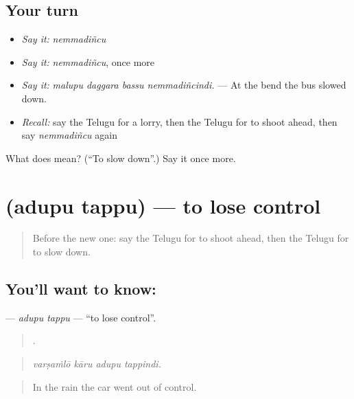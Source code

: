 \subsection*{Your turn}
\begin{itemize}
\raggedright
  \item \emph{Say it:} \emph{nemmadiñcu}
  \item \emph{Say it:} \emph{nemmadiñcu}, once more
  \item \emph{Say it:} \emph{malupu daggara bassu nemmadiñcindi.} — At the bend the bus slowed down.
  \item \emph{Recall:} say the Telugu for a lorry, then the Telugu for to shoot ahead, then say \emph{nemmadiñcu} again
\end{itemize}

\begin{tcolorbox}[breakable,colback=teal!4,colframe=teal!35!black,title={Before you move on}]
What does  mean? (\textquotedblleft{}To slow down\textquotedblright{}.) Say it once more.
\end{tcolorbox}
\section[\texorpdfstring{\te{అదుపు} \te{తప్పు} (adupu tappu)}{అదుపు తప్పు (adupu tappu)}]{  (adupu tappu) — to lose control}

\label{lesson:TE-C445-adupu-tappu}



\begin{quote}
Before the new one: say the Telugu for to shoot ahead, then the Telugu for to slow down.
\end{quote}

\subsection*{You'll want to know:  }
\textbf{ } — \emph{adupu tappu} — \textquotedblleft{}to lose control\textquotedblright{}.

\begin{quote}
   .
\end{quote}

\begin{quote}
\emph{varṣaṁlō kāru adupu tappindi.}
\end{quote}

\begin{quote}
In the rain the car went out of control.
\end{quote}

